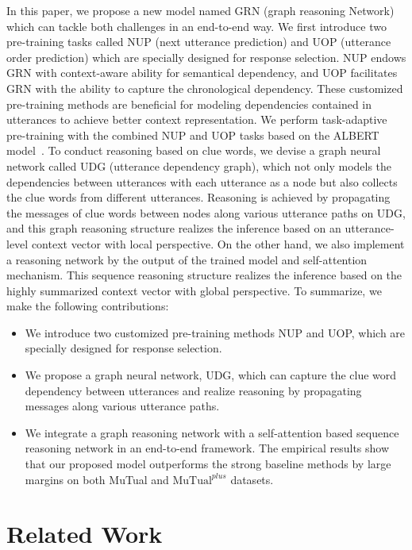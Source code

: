 \documentclass[letterpaper]{article} %
\begin{document}
In this paper, we propose a new model named GRN (graph reasoning Network) which can tackle both challenges in an end-to-end way. We first introduce two pre-training tasks called NUP (next utterance prediction) and UOP (utterance order prediction) which are specially designed for response selection. NUP endows GRN with context-aware ability for semantical dependency, and UOP facilitates GRN with the ability to capture the chronological dependency. These customized pre-training methods are beneficial for modeling dependencies contained in utterances to achieve better context representation. We perform task-adaptive pre-training with the combined NUP and UOP tasks based on the ALBERT model~\cite{Lan2020}. To conduct reasoning based on clue words, we devise a graph neural network called UDG (utterance dependency graph), which not only models the dependencies between utterances with each utterance as a node but also collects the clue words from different utterances. Reasoning is achieved by propagating the messages of clue words between nodes along various utterance paths on UDG, and this graph reasoning structure realizes the inference based on an utterance-level context vector with local perspective. On the other hand, we also implement a reasoning network by the output of the trained model and self-attention mechanism. This sequence reasoning structure realizes the inference based on the highly summarized context vector with global perspective.
To summarize, we make the following contributions:

\begin{itemize}
    \item We introduce two customized pre-training methods NUP and UOP, which are specially designed for response selection.
    \item We propose a graph neural network, UDG, which can capture the clue word dependency between utterances and realize reasoning by propagating messages along various utterance paths.
    \item We integrate a graph reasoning network with a self-attention based sequence reasoning network in an end-to-end framework. The empirical results show that our proposed model outperforms the strong baseline methods by large margins on both MuTual and $\text{MuTual}^{plus}$ datasets.
\end{itemize}

\section{Related Work}
\end{document}
